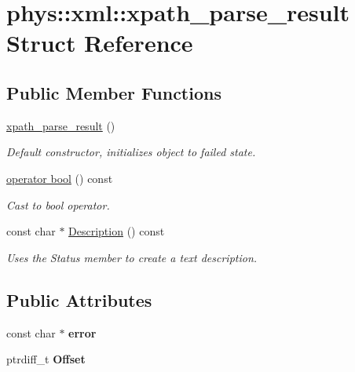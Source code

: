 \hypertarget{structphys_1_1xml_1_1xpath__parse__result}{
\section{phys::xml::xpath\_\-parse\_\-result Struct Reference}
\label{d3/d82/structphys_1_1xml_1_1xpath__parse__result}
}
\subsection*{Public Member Functions}
\begin{DoxyCompactItemize}
\item 
\hypertarget{structphys_1_1xml_1_1xpath__parse__result_a8d76f84208d53049832837761bed2aa2}{
\hyperlink{structphys_1_1xml_1_1xpath__parse__result_a8d76f84208d53049832837761bed2aa2}{xpath\_\-parse\_\-result} ()}
\label{d3/d82/structphys_1_1xml_1_1xpath__parse__result_a8d76f84208d53049832837761bed2aa2}

\begin{DoxyCompactList}\small\item\em Default constructor, initializes object to failed state. \item\end{DoxyCompactList}\item 
\hyperlink{structphys_1_1xml_1_1xpath__parse__result_a6dcc7705327a53c40d27951f1fa135e8}{operator bool} () const 
\begin{DoxyCompactList}\small\item\em Cast to bool operator. \item\end{DoxyCompactList}\item 
const char $\ast$ \hyperlink{structphys_1_1xml_1_1xpath__parse__result_a4d1fb566487cf93d010a99a58e628a2d}{Description} () const 
\begin{DoxyCompactList}\small\item\em Uses the Status member to create a text description. \item\end{DoxyCompactList}\end{DoxyCompactItemize}
\subsection*{Public Attributes}
\begin{DoxyCompactItemize}
\item 
\hypertarget{structphys_1_1xml_1_1xpath__parse__result_aa22bdd4bda9b88bf8fabfe0a6da3f0f8}{
const char $\ast$ {\bfseries error}}
\label{d3/d82/structphys_1_1xml_1_1xpath__parse__result_aa22bdd4bda9b88bf8fabfe0a6da3f0f8}

\item 
\hypertarget{structphys_1_1xml_1_1xpath__parse__result_a12bcc73a5772f076648f03dd75eef761}{
ptrdiff\_\-t {\bfseries Offset}}
\label{d3/d82/structphys_1_1xml_1_1xpath__parse__result_a12bcc73a5772f076648f03dd75eef761}

\end{DoxyCompactItemize}


